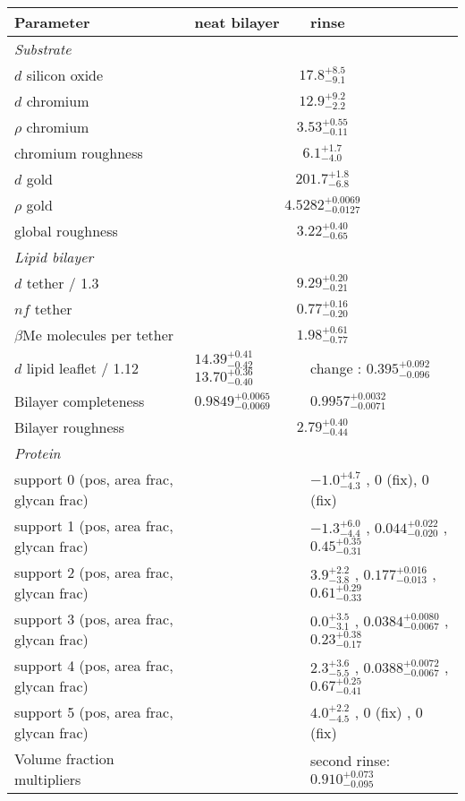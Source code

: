 \documentclass[11pt]{article}
\begin{document}
\renewcommand{\arraystretch}{1.1}

\begin{tabular}[t]{|p{6.5cm}|p{2.0cm}|p{5.6cm}|} \hline
\bf{Parameter} & \bf{neat bilayer} & \bf{rinse} \\ \hline
\multicolumn{3}{|l|}{\textit{Substrate}} \\ \hline
$d$ silicon oxide &\multicolumn{2}{|c|}{ $17.8_{-9.1}^{+8.5}$ } \\ \hline
$d$ chromium &\multicolumn{2}{|c|}{ $12.9_{-2.2}^{+9.2}$ } \\ \hline
$\rho$ chromium &\multicolumn{2}{|c|}{ $3.53_{-0.11}^{+0.55}$ } \\ \hline
chromium roughness &\multicolumn{2}{|c|}{ $6.1_{-4.0}^{+1.7}$ } \\ \hline
$d$ gold &\multicolumn{2}{|c|}{ $201.7_{-6.8}^{+1.8}$ } \\ \hline
$\rho$ gold &\multicolumn{2}{|c|}{ $4.5282_{-0.0127}^{+0.0069}$ } \\ \hline
global roughness &\multicolumn{2}{|c|}{ $3.22_{-0.65}^{+0.40}$ } \\ \hline

\multicolumn{3}{|l|}{\textit{Lipid bilayer}} \\ \hline
$d$ tether / 1.3 &\multicolumn{2}{|c|}{ $9.29_{-0.21}^{+0.20}$ } \\ \hline
$nf$ tether &\multicolumn{2}{|c|}{ $0.77_{-0.20}^{+0.16}$ } \\ \hline
$\beta$Me molecules per tether &\multicolumn{2}{|c|}{ $1.98_{-0.77}^{+0.61}$ } \\ \hline
$d$ lipid leaflet / 1.12 & $14.39_{-0.42}^{+0.41}$ $13.70_{-0.40}^{+0.36}$ & change : $0.395_{-0.096}^{+0.092}$ \\ \hline
Bilayer completeness & $0.9849_{-0.0069}^{+0.0065}$ & $0.9957_{-0.0071}^{+0.0032}$ \\ \hline
Bilayer roughness &\multicolumn{2}{|c|}{ $2.79_{-0.44}^{+0.40}$ } \\ \hline

\multicolumn{3}{|l|}{\textit{Protein}} \\ \hline
support 0 (pos, area frac, glycan frac) & & $-1.0_{-4.3}^{+4.7}$ , 0 (fix), 0 (fix) \\ \hline
support 1 (pos, area frac, glycan frac) & & $-1.3_{-4.4}^{+6.0}$ , $0.044_{-0.020}^{+0.022}$ , $0.45_{-0.31}^{+0.35}$ \\ \hline
support 2 (pos, area frac, glycan frac) & & $3.9_{-3.8}^{+2.2}$ , $0.177_{-0.013}^{+0.016}$ , $0.61_{-0.33}^{+0.29}$ \\ \hline
support 3 (pos, area frac, glycan frac) & & $0.0_{-3.1}^{+3.5}$ , $0.0384_{-0.0067}^{+0.0080}$ , $0.23_{-0.17}^{+0.38}$ \\ \hline
support 4 (pos, area frac, glycan frac) & & $2.3_{-5.5}^{+3.6}$ , $0.0388_{-0.0067}^{+0.0072}$ , $0.67_{-0.41}^{+0.25}$ \\ \hline
support 5 (pos, area frac, glycan frac) & & $4.0_{-4.5}^{+2.2}$ , 0 (fix) , 0 (fix) \\ \hline
Volume fraction multipliers & & second rinse: $0.910_{-0.095}^{+0.073}$ \\ \hline
\end{tabular}
\end{document}
